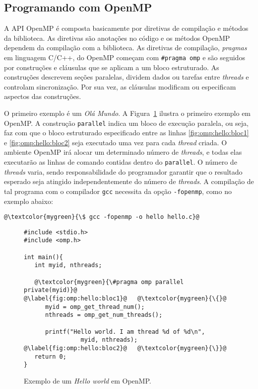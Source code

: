 \subsection{Programando com OpenMP}

A API OpenMP é composta basicamente por diretivas de compilação e métodos da biblioteca. As diretivas são anotações no código e os métodos OpenMP dependem da compilação com a biblioteca. As diretivas de compilação, \emph{pragmas} em linguagem C/C++, do OpenMP começam com \texttt{\#pragma omp} e são seguidos por construções e cláusulas que se aplicam a um bloco estruturado. As construções descrevem seções paralelas, dividem dados ou tarefas entre \textit{threads} e controlam sincronização. Por sua vez, as cláusulas modificam ou especificam aspectos das construções.

O primeiro exemplo é um \emph{Olá Mundo}. A Figura~\ref{fig:omp:hello} ilustra o primeiro exemplo em OpenMP. A construção \texttt{parallel} indica um bloco de execução paralela, ou seja, faz com que o bloco estruturado especificado entre as linhas \ref{fig:omp:hello:bloc1} e \ref{fig:omp:hello:bloc2} seja executado uma vez para cada \textit{thread} criada. O ambiente OpenMP irá alocar um determinado número de \textit{threads}, e todas elas executarão as linhas de comando contidas dentro do \texttt{parallel}. O número de \textit{threads} varia, sendo responsabilidade do programador garantir que o resultado esperado seja atingido independentemente do número de \emph{threads}. A compilação de tal programa com o compilador \texttt{gcc} necessita da opção \texttt{-fopenmp}, como no exemplo abaixo:

\begin{lstlisting}[frame=none, numbers=none]
@\textcolor{mygreen}{\$ gcc -fopenmp -o hello hello.c}@
\end{lstlisting}

\begin{figure}[!htb]
\centering
\begin{lstlisting}
#include <stdio.h>
#include <omp.h>

int main(){
   int myid, nthreads;
   
   @\textcolor{mygreen}{\#pragma omp parallel private(myid)}@
@\label{fig:omp:hello:bloc1}@   @\textcolor{mygreen}{\{}@ 
      myid = omp_get_thread_num();
      nthreads = omp_get_num_threads();

      printf("Hello world. I am thread %d of %d\n",
                myid, nthreads);
@\label{fig:omp:hello:bloc2}@   @\textcolor{mygreen}{\}}@
   return 0;
}
\end{lstlisting}
\caption{Exemplo de um \emph{Hello world} em OpenMP.}
\label{fig:omp:hello}
\end{figure}


